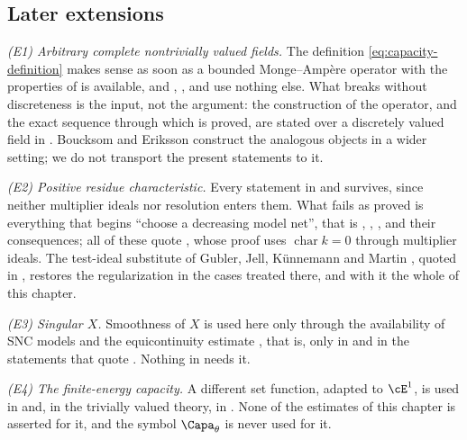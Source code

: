 \subsection{Later extensions}
\label{sec:ch25-later}

\emph{(E1) Arbitrary complete nontrivially valued fields.}  The definition
\eqref{eq:capacity-definition} makes sense as soon as a bounded
Monge--Amp\`ere operator with the properties of
 is available, and
, ,
 and
 use nothing else.  What breaks
without discreteness is the input, not the argument: the construction of the
operator, and the exact sequence  through which
 is proved, are stated over a
discretely valued field in .  Boucksom and
Eriksson \cite{BE21} construct the analogous objects in a wider setting; we
do not transport the present statements to it.

\emph{(E2) Positive residue characteristic.}  Every statement in
 and  survives, since
neither multiplier ideals nor resolution enters them.  What fails as proved
is everything that begins ``choose a decreasing model net'', that is
,
,
,
 and their consequences; all of these
quote , whose proof uses
\(\operatorname{char}k=0\) through multiplier ideals.  The test-ideal
substitute of Gubler, Jell, K\"unnemann and Martin \cite{GJKM19}, quoted in
, restores the regularization in
the cases treated there, and with it the whole of this chapter.

\emph{(E3) Singular \(X\).}  Smoothness of \(X\) is used here only through
the availability of SNC models and the equicontinuity estimate
, that is, only in
 and in the statements that quote
.  Nothing in
 needs it.

\emph{(E4) The finite-energy capacity.}  A different set function, adapted
to \(\cE^1\), is used in  and, in the
trivially valued theory, in .  None of the
estimates of this chapter is asserted for it, and the symbol
\(\Capa_\theta\) is never used for it.

